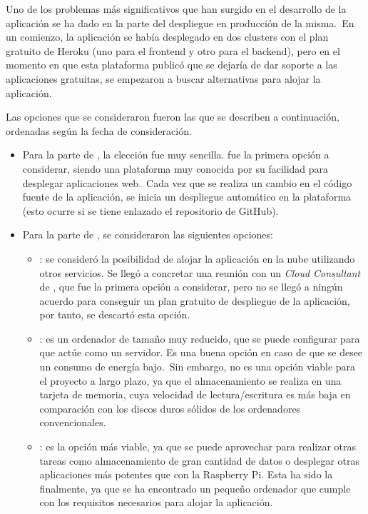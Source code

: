 Uno de los problemas más significativos que han surgido en el desarrollo de la aplicación se ha dado en la parte del
despliegue en producción de la misma.\ En un comienzo, la aplicación se había desplegado en dos clusters con el plan
gratuito de Heroku (uno para el frontend y otro para el backend), pero en el momento en que esta plataforma publicó
que se dejaría de dar soporte a las aplicaciones gratuitas, se empezaron a buscar alternativas para alojar la
aplicación.

Las opciones que se consideraron fueron las que se describen a continuación, ordenadas según la fecha de consideración.

\begin{itemize}
	\item Para la parte de , la elección fue muy sencilla.  fue la primera opción
	a considerar, siendo una plataforma muy conocida por su facilidad para desplegar aplicaciones web.\ Cada vez que se
	realiza un cambio en el código fuente de la aplicación, se inicia un despliegue automático en la plataforma (esto
	ocurre si se tiene enlazado el repositorio de GitHub).

	\item Para la parte de , se consideraron las siguientes opciones:
	\begin{itemize}
		\item {}: se consideró la posibilidad de alojar la aplicación en la nube
		utilizando otros servicios.
		Se llegó a concretar una reunión con un \textit{Cloud Consultant} de , que
		fue la primera opción a considerar, pero no se llegó a ningún acuerdo para conseguir un plan gratuito de
		despliegue de la aplicación, por tanto, se descartó esta opción.

		\item {}: es un ordenador de tamaño muy reducido, que se puede configurar para que
		actúe como un servidor.
		Es una buena opción en caso de que se desee un consumo de energía bajo.\ Sin embargo, no es una opción
		viable para el proyecto a largo plazo, ya que el almacenamiento se realiza en una tarjeta de memoria, cuya
		velocidad de lectura/escritura es más baja en comparación con los discos duros sólidos de los ordenadores
		convencionales.

		\item {}: es la opción más viable, ya que se puede aprovechar para realizar otras
		tareas como
		almacenamiento de gran cantidad de datos o desplegar otras aplicaciones más potentes que con la Raspberry Pi.
		Esta ha sido la  finalmente, ya que se ha encontrado un pequeño ordenador que cumple
		con los requisitos necesarios para alojar la aplicación.
	\end{itemize}
\end{itemize}

